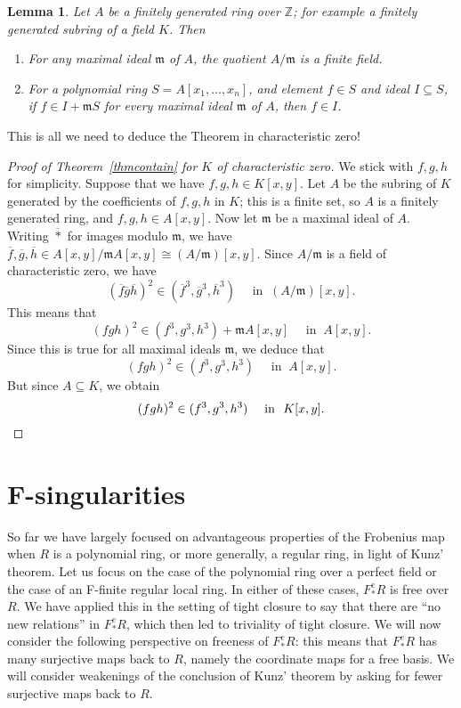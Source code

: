 \documentclass[12pt]{amsart}
\newtheorem{lemma}[theorem]{Lemma}
\theoremstyle{definition}
\numberwithin{equation}{theorem}
\def\frakm{\mathfrak{m}}
\def\ZZ{\mathbb{Z}}
\begin{document}
\begin{lemma}
Let $A$ be a finitely generated ring over $\ZZ$; for example a finitely generated subring of a field $K$. Then
\begin{enumerate}
\item For any maximal ideal $\frakm$ of $A$, the quotient $A/\frakm$ is a finite field.
\item For a polynomial ring $S=A[x_1,\dots,x_n]$, and element $f\in S$ and ideal $I\subseteq S$, if $f\in I + \frakm S$ for every maximal ideal $\frakm$ of $A$, then $f\in I$.
\end{enumerate}
\end{lemma}

This is all we need to deduce the Theorem in characteristic zero!

\begin{proof}[Proof of Theorem~\ref{thmcontain} for $K$ of characteristic zero]
We stick with $f,g,h$ for simplicity. Suppose that we have $f,g,h\in K[x,y]$. Let $A$ be the subring of $K$ generated by the coefficients of $f,g,h$ in $K$; this is a finite set, so $A$ is a finitely generated ring, and $f,g,h\in A[x,y]$. Now let $\frakm$ be a maximal ideal of $A$. Writing $\overline{*}$ for images modulo $\frakm$, we have $\overline{f},\overline{g},\overline{h} \in A[x,y]/\frakm A[x,y] \cong (A/\frakm)[x,y]$. Since $A/\frakm$ is a field of characteristic zero, we have \[ (\overline{f}\overline{g}\overline{h})^2  \in (\overline{f}^3,\overline{g}^3,\overline{h}^3) \quad \text{ in } \ (A/\frakm)[x,y].\] This means that
\[ (fgh)^2  \in (f^3,g^3,h^3) + \frakm A[x,y] \quad \text{ in } \ A[x,y].\]
Since this is true for all maximal ideals $\frakm$, we deduce that
\[ (fgh)^2  \in (f^3,g^3,h^3) \quad \text{ in } \ A[x,y].\]
But since $A\subseteq K$, we obtain
\[ (fgh)^2  \in (f^3,g^3,h^3) \quad \text{ in } \ K[x,y].\qedhere\]
\end{proof}



\newpage



\section{F-singularities}

So far we have largely focused on advantageous properties of the Frobenius map when $R$ is a polynomial ring, or more generally, a regular ring, in light of Kunz' theorem. Let us focus on the case of the polynomial ring over a perfect field or the case of an F-finite regular local ring. In either of these cases, $F^e_* R$ is free over $R$. We have applied this in the setting of tight closure to say that there are ``no new relations'' in $F^e_*R$, which then led to triviality of tight closure. We will now consider the following perspective on freeness of $F^e_* R$: this means that $F^e_* R$ has many surjective maps back to $R$, namely the coordinate maps for a free basis. We will consider weakenings of the conclusion of Kunz' theorem by asking for fewer surjective maps back to $R$.
\end{document}
